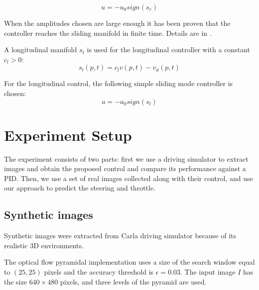 \documentclass[letterpaper, 10 pt, conference]{ieeeconf}  %
\begin{document}
\begin{equation}
    u=-u_0sign(s_r)
\end{equation}

When the amplitudes chosen are large enough it has been proven that the controller reaches the sliding manifold in finite time. Details are in \cite{utkin2009sliding}. 

A longitudinal manifold $s_t$ is used for the longitudinal controller with a constant $c_l>0$:
\begin{equation}
    s_l(p,t)=c_l v(p,t)-v_d(p,t)
\end{equation}

For the longitudinal control, the following simple sliding mode controller is chosen:
\begin{equation}
        a=-a_0sign(s_l)
\end{equation}

\section{Experiment Setup}

The experiment consists of two parts: first we use a driving simulator to extract images and obtain the proposed control and compare its performance against a PID. Then, we use a set of real images collected along with their control, and use our approach to predict the steering and throttle.

\subsection{Synthetic images}\label{sec:synthetic}

Synthetic images were extracted from Carla driving simulator \cite{dosovitskiy2017carla} because of its realistic 3D environments. 



The optical flow pyramidal implementation uses a size of the search window equal to $(25, 25)$ pixels and the accuracy threshold is $\epsilon=0.03$. The input image $I$ has the size $640 \times 480$ pixels, and three levels of the pyramid are used.
\end{document}
